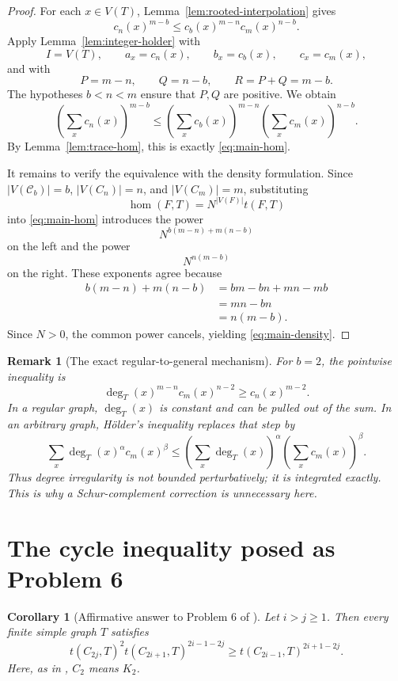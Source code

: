 \documentclass[11pt]{article}
\newtheorem{corollary}[theorem]{Corollary}
\newtheorem{remark}[theorem]{Remark}
\newcommand{\homn}{\operatorname{hom}}
\newcommand{\1}{\mathbf{1}}
\newcommand{\Ct}{\mathcal{C}}
\begin{document}
\begin{proof}
For each $x\in V(T)$, Lemma~\ref{lem:rooted-interpolation} gives
\[
  c_n(x)^{m-b}
  \le
  c_b(x)^{m-n}c_m(x)^{n-b}.
\]
Apply Lemma~\ref{lem:integer-holder} with
\[
  I=V(T),
  \qquad
  a_x=c_n(x),
  \qquad
  b_x=c_b(x),
  \qquad
  c_x=c_m(x),
\]
and with
\[
  P=m-n,
  \qquad
  Q=n-b,
  \qquad
  R=P+Q=m-b.
\]
The hypotheses $b<n<m$ ensure that $P,Q$ are positive.  We obtain
\[
  \left(\sum_xc_n(x)\right)^{m-b}
  \le
  \left(\sum_xc_b(x)\right)^{m-n}
  \left(\sum_xc_m(x)\right)^{n-b}.
\]
By Lemma~\ref{lem:trace-hom}, this is exactly
\eqref{eq:main-hom}.

It remains to verify the equivalence with the density formulation.  Since
$|V(\Ct_b)|=b$, $|V(C_n)|=n$, and $|V(C_m)|=m$, substituting
\[
  \homn(F,T)=N^{|V(F)|}t(F,T)
\]
into \eqref{eq:main-hom} introduces the power
\[
  N^{b(m-n)+m(n-b)}
\]
on the left and the power
\[
  N^{n(m-b)}
\]
on the right.  These exponents agree because
\[
\begin{aligned}
  b(m-n)+m(n-b)
  &=bm-bn+mn-mb\\
  &=mn-bn\\
  &=n(m-b).
\end{aligned}
\]
Since $N>0$, the common power cancels, yielding
\eqref{eq:main-density}.
\end{proof}

\begin{remark}[The exact regular-to-general mechanism]
For $b=2$, the pointwise inequality is
\[
  \deg_T(x)^{m-n}c_m(x)^{n-2}
  \ge c_n(x)^{m-2}.
\]
In a regular graph, $\deg_T(x)$ is constant and can be pulled out of the sum.
In an arbitrary graph, H\"older's inequality replaces that step by
\[
  \sum_x\deg_T(x)^\alpha c_m(x)^\beta
  \le
  \left(\sum_x\deg_T(x)\right)^\alpha
  \left(\sum_xc_m(x)\right)^\beta.
\]
Thus degree irregularity is not bounded perturbatively; it is integrated
exactly.  This is why a Schur-complement correction is unnecessary here.
\end{remark}

\section{The cycle inequality posed as Problem 6}

\begin{corollary}[Affirmative answer to Problem 6 of \cite{BRRW2025}]
\label{cor:problem6}
Let $i>j\ge1$.  Then every finite simple graph $T$ satisfies
\[
  t(C_{2j},T)^2
  t(C_{2i+1},T)^{2i-1-2j}
  \ge
  t(C_{2i-1},T)^{2i+1-2j}.
  \tag{6.1}\label{eq:problem6}
\]
Here, as in \cite{BRRW2025}, $C_2$ means $K_2$.
\end{corollary}
\end{document}

